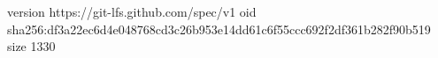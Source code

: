 version https://git-lfs.github.com/spec/v1
oid sha256:df3a22ec6d4e048768cd3c26b953e14dd61c6f55ccc692f2df361b282f90b519
size 1330
